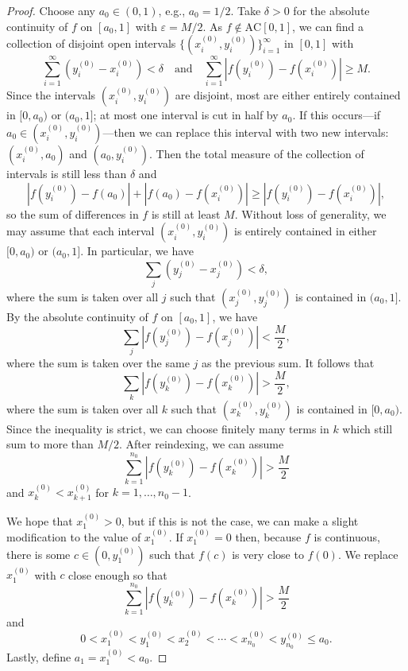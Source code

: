 \documentclass[12pt]{article}
\theoremstyle{definition}
\newcommand{\isp}[1]{\quad\text{#1}\quad}
\newcommand{\eps}{\varepsilon}
\newcommand{\<}{\langle}
\renewcommand{\>}{\rangle}
\begin{document}
\begin{proof}
    Choose any $a_0 \in (0, 1)$, e.g., $a_0 = 1/2$.
    Take $\delta > 0$ for the absolute continuity of $f$ on $[a_0, 1]$ with $\eps = M/2$.
    As $f \notin \mathrm{AC}[0, 1]$, we can find a collection of disjoint open intervals $\{(x_i^{(0)}, y_i^{(0)})\}_{i=1}^{\infty}$ in $[0, 1]$ with
    \[
        \sum_{i=1}^{\infty} (y_i^{(0)} - x_i^{(0)}) < \delta
        \isp{and}
        \sum_{i=1}^{\infty} |f(y_i^{(0)}) - f(x_i^{(0)})| \geq M.
    \]
    Since the intervals $(x_i^{(0)}, y_i^{(0)})$ are disjoint, most are either entirely contained in $[0, a_0)$ or $(a_0, 1]$; at most one interval is cut in half by $a_0$.
    If this occurs---if $a_0 \in (x_i^{(0)}, y_i^{(0)})$---then we can replace this interval with two new intervals: $(x_i^{(0)}, a_0)$ and $(a_0, y_i^{(0)})$.
    Then the total measure of the collection of intervals is still less than $\delta$ and
    \[
        |f(y_i^{(0)}) - f(a_0)| + |f(a_0) - f(x_i^{(0)})|
            \geq |f(y_i^{(0)}) - f(x_i^{(0)})|,
    \]
    so the sum of differences in $f$ is still at least $M$.
    Without loss of generality, we may assume that each interval $(x_i^{(0)}, y_i^{(0)})$ is entirely contained in either $[0, a_0)$ or $(a_0, 1]$.
    In particular, we have
    \[
        \sum_j (y_j^{(0)} - x_j^{(0)}) < \delta,
    \]
    where the sum is taken over all $j$ such that $(x_j^{(0)}, y_j^{(0)})$ is contained in $(a_0, 1]$.
    By the absolute continuity of $f$ on $[a_0, 1]$, we have
    \[
        \sum_j |f(y_j^{(0)}) - f(x_j^{(0)})| < \frac{M}{2},
    \]
    where the sum is taken over the same $j$ as the previous sum.
    It follows that
    \[
        \sum_k |f(y_k^{(0)}) - f(x_k^{(0)})| > \frac{M}{2},
    \]
    where the sum is taken over all $k$ such that $(x_k^{(0)}, y_k^{(0)})$ is contained in $[0, a_0)$.
    Since the inequality is strict, we can choose finitely many terms in $k$ which still sum to more than $M/2$.
    After reindexing, we can assume
    \[
        \sum_{k=1}^{n_0} |f(y_k^{(0)}) - f(x_k^{(0)})| > \frac{M}{2}
    \]
    and $x_k^{(0)} < x_{k+1}^{(0)}$ for $k = 1, \dots, n_0 - 1$.

    We hope that $x_1^{(0)} > 0$, but if this is not the case, we can make a slight modification to the value of $x_1^{(0)}$.
    If $x_1^{(0)} = 0$ then, because $f$ is continuous, there is some $c \in (0, y_1^{(0)})$ such that $f(c)$ is very close to $f(0)$.
    We replace $x_1^{(0)}$ with $c$ close enough so that
    \[
        \sum_{k=1}^{n_0} |f(y_k^{(0)}) - f(x_k^{(0)})| > \frac{M}{2}
    \]
    and
    \[
        0 < x_1^{(0)} < y_1^{(0)} < x_2^{(0)} < \cdots < x_{n_0}^{(0)} < y_{n_0}^{(0)} \leq a_0.
    \]
    Lastly, define $a_1 = x_1^{(0)} < a_0$.


\end{proof}
\end{document}
